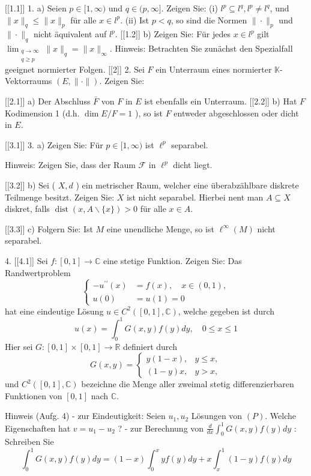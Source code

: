 
[[1.1]]
1. a) Seien $p \in[1, \infty)$ und $q \in(p, \infty]$. Zeigen Sie:
(i) $l^p \subseteq l^q, l^p \neq l^q$, und $\|x\|_q \leq\|x\|_p$ für alle $x \in l^p$.
(ii) Ist $p<q$, so sind die Normen $\|\cdot\|_p$ und $\|\cdot\|_q$ nicht äquivalent auf $l^p$.
[[1.2]]
b) Zeigen Sie: Für jedes $x \in l^p$ gilt $\lim _{\substack{q \rightarrow \infty \\ q \geq p}}\|x\|_q=\|x\|_{\infty}$.
Hinweis: Betrachten Sie zunächst den Spezialfall geeignet normierter Folgen.
[[2]]
2. Sei $F$ ein Unterraum eines normierter $\mathbb{K}$-Vektorraums $(E,\|\cdot\|)$. Zeigen Sie:

[[2.1]]
a) Der Abschluss $\bar{F}$ von $F$ in $E$ ist ebenfalls ein Unterraum.
[[2.2]]
b) Hat $F$ Kodimension 1 (d.h. $\operatorname{dim} E / F=1$ ), so ist $F$ entweder abgeschlossen oder dicht in $E$.

[[3.1]]
3. a) Zeigen Sie: Für $p \in[1, \infty)$ ist $\ell^p$ separabel.

Hinweis: Zeigen Sie, dass der Raum $\mathcal{F}$ in $\ell^p$ dicht liegt.

[[3.2]]
b) Sei ( $X, d$ ) ein metrischer Raum, welcher eine überabzählbare diskrete Teilmenge besitzt. Zeigen Sie: $X$ ist nicht separabel.
Hierbei nent man $A \subseteq X$ diskret, falls $\operatorname{dist}(x, A \backslash\{x\})>0$ für alle $x \in A$.

[[3.3]]
c) Folgern Sie: Ist $M$ eine unendliche Menge, so ist $\ell^{\infty}(M)$ nicht separabel.


4. 
[[4.1]]
Sei $f:[0,1] \rightarrow \mathbb{C}$ eine stetige Funktion. Zeigen Sie: Das Randwertproblem
$$
\left\{\begin{aligned}
-u^{\prime \prime}(x) & =f(x), \quad x \in(0,1), \\
u(0) & =u(1)=0
\end{aligned}\right.
$$
hat eine eindeutige Lösung $u \in C^2([0,1], \mathbb{C})$, welche gegeben ist durch
$$
u(x)=\int_0^1 G(x, y) f(y) d y, \quad 0 \leq x \leq 1
$$
Hier sei $G:[0,1] \times[0,1] \rightarrow \mathbb{R}$ definiert durch
$$
G(x, y)= \begin{cases}y(1-x), & y \leq x, \\ (1-y) x, & y>x,\end{cases}
$$
und $C^2([0,1], \mathbb{C})$ bezeichne die Menge aller zweimal stetig differenzierbaren Funktionen von $[0,1]$ nach $\mathbb{C}$.

Hinweis (Aufg. 4)
- zur Eindeutigkeit: Seien $u_1, u_2$ Lösungen von $(P)$. Welche Eigenschaften hat $v=u_1-u_2$ ?
- zur Berechnung von $\frac{d}{d x} \int_0^1 G(x, y) f(y) d y$ : Schreiben Sie
$$
\int_0^1 G(x, y) f(y) d y=(1-x) \int_0^x y f(y) d y+x \int_x^1(1-y) f(y) d y
$$

